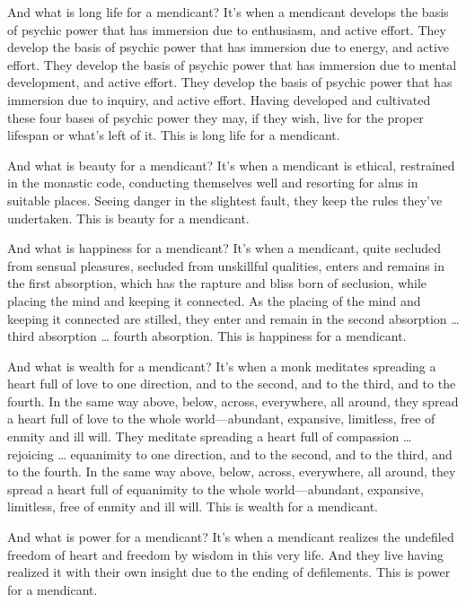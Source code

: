 \documentclass[12pt,openany]{book}%
\begin{document}
And what is long life for a mendicant? It’s when a mendicant develops the basis of psychic power that has immersion due to enthusiasm, and active effort. They develop the basis of psychic power that has immersion due to energy, and active effort. They develop the basis of psychic power that has immersion due to mental development, and active effort. They develop the basis of psychic power that has immersion due to inquiry, and active effort. Having developed and cultivated these four bases of psychic power they may, if they wish, live for the proper lifespan or what’s left of it. This is long life for a mendicant. 

And what is beauty for a mendicant? It’s when a mendicant is ethical, restrained in the monastic code, conducting themselves well and resorting for alms in suitable places. Seeing danger in the slightest fault, they keep the rules they’ve undertaken. This is beauty for a mendicant. 

And what is happiness for a mendicant? It’s when a mendicant, quite secluded from sensual pleasures, secluded from unskillful qualities, enters and remains in the first absorption, which has the rapture and bliss born of seclusion, while placing the mind and keeping it connected. As the placing of the mind and keeping it connected are stilled, they enter and remain in the second absorption … third absorption … fourth absorption. This is happiness for a mendicant. 

And what is wealth for a mendicant? It’s when a monk meditates spreading a heart full of love to one direction, and to the second, and to the third, and to the fourth. In the same way above, below, across, everywhere, all around, they spread a heart full of love to the whole world—abundant, expansive, limitless, free of enmity and ill will. They meditate spreading a heart full of compassion … rejoicing … equanimity to one direction, and to the second, and to the third, and to the fourth. In the same way above, below, across, everywhere, all around, they spread a heart full of equanimity to the whole world—abundant, expansive, limitless, free of enmity and ill will. This is wealth for a mendicant. 

And what is power for a mendicant? It’s when a mendicant realizes the undefiled freedom of heart and freedom by wisdom in this very life. And they live having realized it with their own insight due to the ending of defilements. This is power for a mendicant. 
\end{document}
